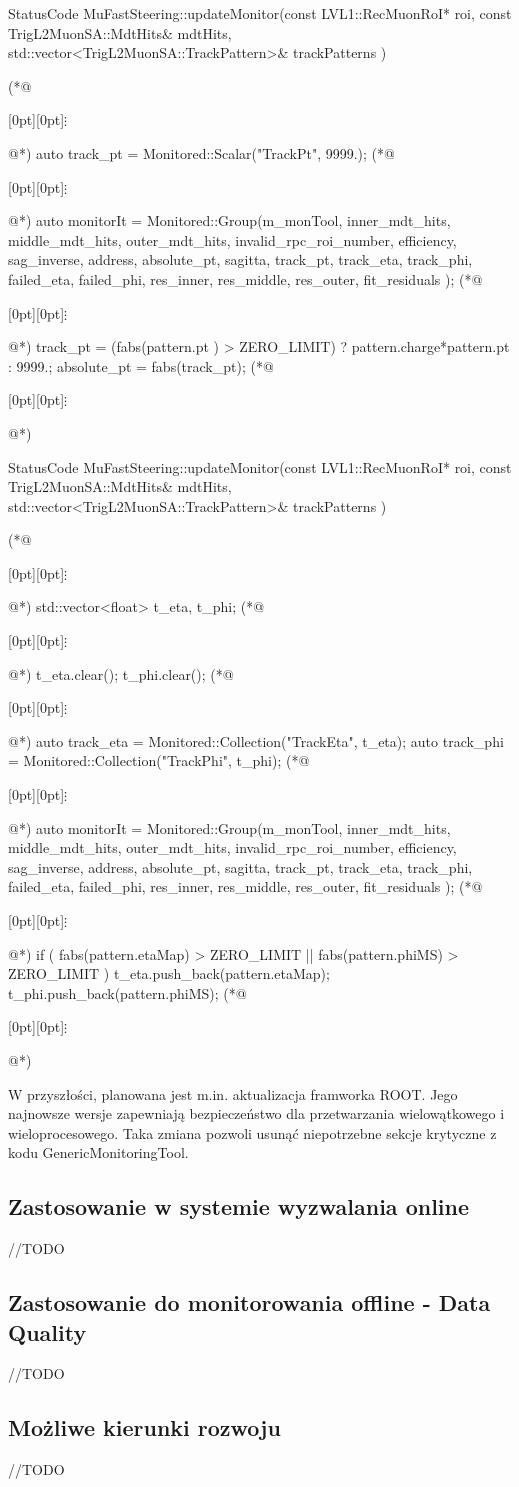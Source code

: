 \begin{cpp}[caption=TrackPt, label={lst:athena:track_pt}]
StatusCode MuFastSteering::updateMonitor(const LVL1::RecMuonRoI* roi,
  const TrigL2MuonSA::MdtHits& mdtHits,
  std::vector<TrigL2MuonSA::TrackPattern>& trackPatterns )
{
(*@\centerline{\raisebox{-1pt}[0pt][0pt]{$\vdots$}}@*)
  auto track_pt 	= Monitored::Scalar("TrackPt", 9999.);
(*@\centerline{\raisebox{-1pt}[0pt][0pt]{$\vdots$}}@*)
  auto monitorIt	= Monitored::Group(m_monTool, inner_mdt_hits, middle_mdt_hits, outer_mdt_hits, invalid_rpc_roi_number, efficiency, sag_inverse, address, absolute_pt, sagitta, track_pt, track_eta, track_phi, failed_eta, failed_phi, res_inner, res_middle, res_outer, fit_residuals );
(*@\centerline{\raisebox{-1pt}[0pt][0pt]{$\vdots$}}@*)
  track_pt = (fabs(pattern.pt ) > ZERO_LIMIT) ? pattern.charge*pattern.pt : 9999.;
  absolute_pt = fabs(track_pt);
(*@\centerline{\raisebox{-1pt}[0pt][0pt]{$\vdots$}}@*)
}
\end{cpp}

\begin{cpp}[caption=TrackEta vs TrackPhi, label={lst:athena:track_eta_vs_track_phi}]
StatusCode MuFastSteering::updateMonitor(const LVL1::RecMuonRoI* roi,
  const TrigL2MuonSA::MdtHits& mdtHits,
  std::vector<TrigL2MuonSA::TrackPattern>& trackPatterns )
{
(*@\centerline{\raisebox{-1pt}[0pt][0pt]{$\vdots$}}@*)
  std::vector<float> t_eta, t_phi;
(*@\centerline{\raisebox{-1pt}[0pt][0pt]{$\vdots$}}@*)
  t_eta.clear();
  t_phi.clear();
(*@\centerline{\raisebox{-1pt}[0pt][0pt]{$\vdots$}}@*)
  auto track_eta	= Monitored::Collection("TrackEta", t_eta);
  auto track_phi	= Monitored::Collection("TrackPhi", t_phi);
(*@\centerline{\raisebox{-1pt}[0pt][0pt]{$\vdots$}}@*)
  auto monitorIt	= Monitored::Group(m_monTool, inner_mdt_hits, middle_mdt_hits, outer_mdt_hits, invalid_rpc_roi_number, efficiency, sag_inverse, address, absolute_pt, sagitta, track_pt, track_eta, track_phi, failed_eta, failed_phi, res_inner, res_middle, res_outer, fit_residuals );
(*@\centerline{\raisebox{-1pt}[0pt][0pt]{$\vdots$}}@*)
  if ( fabs(pattern.etaMap) > ZERO_LIMIT || fabs(pattern.phiMS) > ZERO_LIMIT ) {
    t_eta.push_back(pattern.etaMap);
    t_phi.push_back(pattern.phiMS);
  }
(*@\centerline{\raisebox{-1pt}[0pt][0pt]{$\vdots$}}@*)
}
\end{cpp}

W przyszłości, planowana jest m.in. aktualizacja framworka ROOT.
Jego najnowsze wersje zapewniają bezpieczeństwo dla przetwarzania wielowątkowego i wieloprocesowego. 
Taka zmiana pozwoli usunąć niepotrzebne sekcje krytyczne z kodu GenericMonitoringTool.

\subsection{Zastosowanie w systemie wyzwalania online}
//TODO
\subsection{Zastosowanie do monitorowania offline - Data Quality}
//TODO~\cite{atlas-multithread-article}
\subsection{Możliwe kierunki rozwoju}
//TODO
